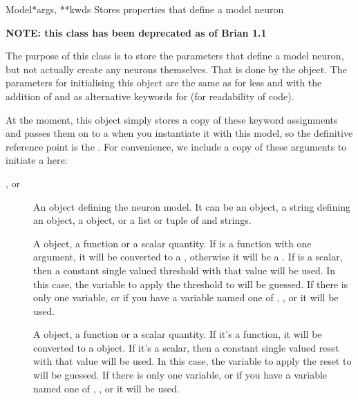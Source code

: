 \documentclass[letterpaper,10pt,english]{manual}
\begin{document}
\hypertarget{brian.Model}{}\begin{classdesc}{Model}{*args, **kwds}
Stores properties that define a model neuron

\textbf{NOTE: this class has been deprecated as of Brian 1.1}

The purpose of this class is to store the parameters that define
a model neuron, but not actually create any neurons themselves. That is
done by the \hyperlink{brian.NeuronGroup}{} object. The parameters for initialising
this object are the same as for \hyperlink{brian.NeuronGroup}{} less  and
with the addition of  and  as
alternative keywords for  (for readability of code).

At the moment, this object simply stores a copy of these keyword
assignments and passes them on to a \hyperlink{brian.NeuronGroup}{} when you
instantiate it with this model, so the definitive reference point is
the \hyperlink{brian.NeuronGroup}{}. For convenience, we include a copy of these
arguments to initiate a \hyperlink{brian.Model}{} here:
\begin{description}
\item[,  or ]
An object defining the neuron model. It can be
an \hyperlink{brian.Equations}{} object, a string defining an \hyperlink{brian.Equations}{} object,
a  object, or a list or tuple of \hyperlink{brian.Equations}{} and
strings.

\item[]
A \hyperlink{brian.Threshold}{} object, a function or a scalar quantity.
If  is a function with one argument, it will be
converted to a \hyperlink{brian.SimpleFunThreshold}{}, otherwise it will be a
\hyperlink{brian.FunThreshold}{}. If  is a scalar, then a constant
single valued threshold with that value will be used. In this case,
the variable to apply the threshold to will be guessed. If there is
only one variable, or if you have a variable named one of
, ,  or  it will be used.

\item[]
A \hyperlink{brian.Reset}{} object, a function or a scalar quantity. If it's a
function, it will be converted to a \hyperlink{brian.FunReset}{} object. If it's
a scalar, then a constant single valued reset with that value will
be used. In this case,
the variable to apply the reset to will be guessed. If there is
only one variable, or if you have a variable named one of
, ,  or  it will be used.


\end{description}
\end{classdesc}
\end{document}
